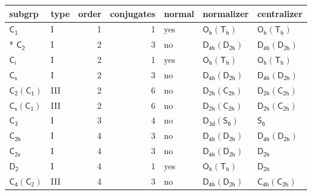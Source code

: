 \documentclass[10pt,a4paper]{article}
\numberwithin{equation}{section}
\newcommand{\grp}[1]{\mathsf{#1}}
\begin{document}
{\small\begin{longtable}{@{}llrrlll@{}}\toprule
subgrp & type & order & conjugates & normal & normalizer & centralizer\\\midrule\endhead
\bottomrule\endfoot\endlastfoot
\href{../../../rotation/data/pdf/C1.pdf}{$\grp{C_{1}}$} & I & 1 & 1 & yes & \href{Oh-Th.pdf}{$\grp{O_{h}}(\grp{T_{h}})$} & \href{Oh-Th.pdf}{$\grp{O_{h}}(\grp{T_{h}})$}\\*
\href{../../../rotation/data/pdf/C2.pdf}{$\grp{C_{2}}$} & I & 2 & 3 & no & \href{D4h-D2h.pdf}{$\grp{D_{4h}}(\grp{D_{2h}})$} & \href{D4h-D2h.pdf}{$\grp{D_{4h}}(\grp{D_{2h}})$}\\
\href{../../../rotation/data/pdf/S2.pdf}{$\grp{C_{i}}$} & I & 2 & 1 & yes & \href{Oh-Th.pdf}{$\grp{O_{h}}(\grp{T_{h}})$} & \href{Oh-Th.pdf}{$\grp{O_{h}}(\grp{T_{h}})$}\\
\href{../../../rotation/data/pdf/C1v.pdf}{$\grp{C_{s}}$} & I & 2 & 3 & no & \href{D4h-D2h.pdf}{$\grp{D_{4h}}(\grp{D_{2h}})$} & \href{D4h-D2h.pdf}{$\grp{D_{4h}}(\grp{D_{2h}})$}\\
\href{C2-C1.pdf}{$\grp{C_{2}}(\grp{C_{1}})$} & III & 2 & 6 & no & \href{D2h-C2h.pdf}{$\grp{D_{2h}}(\grp{C_{2h}})$} & \href{D2h-C2h.pdf}{$\grp{D_{2h}}(\grp{C_{2h}})$}\\
\href{C1v-C1.pdf}{$\grp{C_{s}}(\grp{C_{1}})$} & III & 2 & 6 & no & \href{D2h-C2h.pdf}{$\grp{D_{2h}}(\grp{C_{2h}})$} & \href{D2h-C2h.pdf}{$\grp{D_{2h}}(\grp{C_{2h}})$}\\
\href{../../../rotation/data/pdf/C3.pdf}{$\grp{C_{3}}$} & I & 3 & 4 & no & \href{D3d-S6.pdf}{$\grp{D_{3d}}(\grp{S_{6}})$} & \href{../../../rotation/data/pdf/S6.pdf}{$\grp{S_{6}}$}\\
\href{../../../rotation/data/pdf/C2h.pdf}{$\grp{C_{2h}}$} & I & 4 & 3 & no & \href{D4h-D2h.pdf}{$\grp{D_{4h}}(\grp{D_{2h}})$} & \href{D4h-D2h.pdf}{$\grp{D_{4h}}(\grp{D_{2h}})$}\\
\href{../../../rotation/data/pdf/C2v.pdf}{$\grp{C_{2v}}$} & I & 4 & 3 & no & \href{D4h-D2h.pdf}{$\grp{D_{4h}}(\grp{D_{2h}})$} & \href{../../../rotation/data/pdf/D2h.pdf}{$\grp{D_{2h}}$}\\
\href{../../../rotation/data/pdf/D2.pdf}{$\grp{D_{2}}$} & I & 4 & 1 & yes & \href{Oh-Th.pdf}{$\grp{O_{h}}(\grp{T_{h}})$} & \href{../../../rotation/data/pdf/D2h.pdf}{$\grp{D_{2h}}$}\\
\href{C4-C2.pdf}{$\grp{C_{4}}(\grp{C_{2}})$} & III & 4 & 3 & no & \href{D4h-D2h.pdf}{$\grp{D_{4h}}(\grp{D_{2h}})$} & \href{C4h-C2h.pdf}{$\grp{C_{4h}}(\grp{C_{2h}})$}\\

\end{longtable}}
\end{document}
